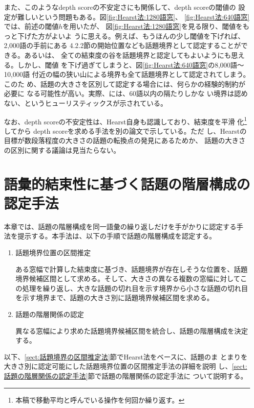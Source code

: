 また、このようなdepth scoreの不安定さにも関係して、depth scoreの閾値の
設定が難しいという問題もある。図\ref{fig:Hearst法:1280語窓}、
\ref{fig:Hearst法:640語窓}では、前述の閾値$h$を用いたが、
図\ref{fig:Hearst法:1280語窓}を見る限り、閾値をもっと下げた方がよいよ
うに思える。例えば、もうほんの少し閾値を下げれば、2,000語の手前にある
4.2.2節の開始位置なども話題境界として認定することができる。あるいは、
全ての結束度の谷を話題境界と認定してもよいようにも思える。しかし、閾値
を下げ過ぎてしまうと、図\ref{fig:Hearst法:640語窓}の8,000語〜10,000語
付近の幅の狭い山による境界も全て話題境界として認定されてしまう。このた
め、話題の大きさを区別して認定する場合には、何らかの経験的制約が必要に
なる可能性が高い。実際、\cite{PACL-32-P9}には、60語以内の隔たりしかな
い境界は認めない、というヒューリスティックスが示されている。

なお、depth scoreの不安定性は、Hearst自身も認識しており、結束度を平滑
化\footnote{本稿で移動平均と呼んでいる操作を何回か繰り返す。}してから
depth scoreを求める手法を別の論文\cite{CL-V23N1P33}で示している。ただ
し、Hearstの目標が数段落程度の大きさの話題の転換点の発見にあるためか、
話題の大きさの区別に関する議論は見当たらない。

\section{語彙的結束性に基づく話題の階層構成の認定手法}
\label{sect:話題構成認定手法}

本章では、話題の階層構成を同一語彙の繰り返しだけを手がかりに認定する手
法を提示する。本手法は、以下の手順で話題の階層構成を認定する。

\begin{enumerate}
\item 話題境界位置の区間推定\label{item:話題境界の区間推定}

  ある窓幅で計算した結束度に基づき、話題境界が存在しそうな位置を、話題
  境界候補区間として求める。そして、大きさの異なる複数の窓幅に対してこ
  の処理を繰り返し、大きな話題の切れ目を示す境界から小さな話題の切れ目
  を示す境界まで、話題の大きさ別に話題境界候補区間を求める。

\item 話題の階層関係の認定

  異なる窓幅により求めた話題境界候補区間を統合し、話題の階層構成を決定
  する。
\end{enumerate}

以下、\ref{sect:話題境界の区間推定法}節でHearst法をベースに、話題のま
とまりを大きさ別に認定可能にした話題境界位置の区間推定手法の詳細を説明
し、\ref{sect:話題の階層関係の認定手法}節で話題の階層関係の認定手法に
ついて説明する。

